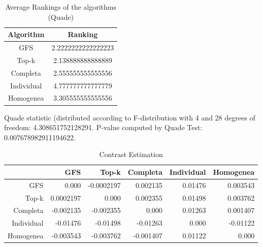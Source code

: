 \documentclass[a4paper,10pt]{article}
\begin{document}
\begin{landscape}
\newpage

\begin{table}[!htp]
\centering
\caption{Average Rankings of the algorithms (Quade)
}\begin{tabular}{c|c}
Algorithm&Ranking\\
\hline
GFS&2.2222222222222223\\
Top-k&2.138888888888889\\
Completa&2.555555555555556\\
Individual&4.777777777777779\\
Homogenea&3.305555555555556\\
\end{tabular}
\end{table}
Quade statistic (distributed according to F-distribution with 4 and 28 degrees of freedom: 4.308651752128291. 
P-value computed by Quade Test: 0.007678982911194622.\newline


\newpage

\begin{table}[!htp]
\centering\tiny
\caption{Contrast Estimation}
\begin{tabular}{
|r|r|r|r|r|r|}
\hline
 &GFS&Top-k&Completa&Individual&Homogenea\\
\hline
GFS&0.000&-0.0002197&0.002135&0.01476&0.003543\\
\hline
Top-k&0.0002197&0.000&0.002355&0.01498&0.003762\\
\hline
Completa&-0.002135&-0.002355&0.000&0.01263&0.001407\\
\hline
Individual&-0.01476&-0.01498&-0.01263&0.000&-0.01122\\
\hline
Homogenea&-0.003543&-0.003762&-0.001407&0.01122&0.000\\
\hline

\end{tabular}
\end{table}

\newpage


\end{landscape}
\end{document}
